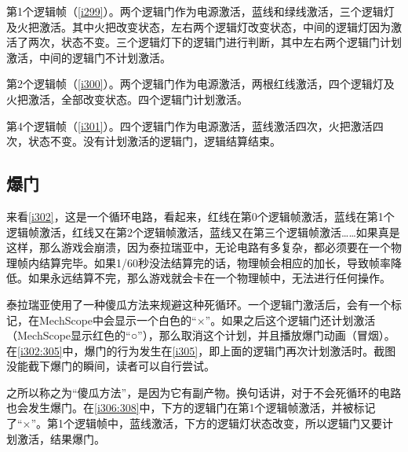 第1个逻辑帧（\autoref{i299}）。两个逻辑门作为电源激活，蓝线和绿线激活，三个逻辑灯及火把激活。其中火把改变状态，左右两个逻辑灯改变状态，中间的逻辑灯因为激活了两次，状态不变。三个逻辑灯下的逻辑门进行判断，其中左右两个逻辑门计划激活，中间的逻辑门不计划激活。

第2个逻辑帧（\autoref{i300}）。两个逻辑门作为电源激活，两根红线激活，四个逻辑灯及火把激活，全部改变状态。四个逻辑门计划激活。

第4个逻辑帧（\autoref{i301}）。四个逻辑门作为电源激活，蓝线激活四次，火把激活四次，状态不变。没有计划激活的逻辑门，逻辑结算结束。

\subsection{爆门}

来看\autoref{i302}，这是一个循环电路，看起来，红线在第0个逻辑帧激活，蓝线在第1个逻辑帧激活，红线又在第2个逻辑帧激活，蓝线又在第三个逻辑帧激活……如果真是这样，那么游戏会崩溃，因为泰拉瑞亚中，无论电路有多复杂，都必须要在一个物理帧内结算完毕。如果1/60秒没法结算完的话，物理帧会相应的加长，导致帧率降低。如果永远结算不完，那么游戏就会卡在一个物理帧中，无法进行任何操作。

泰拉瑞亚使用了一种傻瓜方法来规避这种死循环。一个逻辑门激活后，会有一个标记，在MechScope中会显示一个白色的“×”。如果之后这个逻辑门还计划激活（MechScope显示红色的“○”），那么取消这个计划，并且播放爆门动画（冒烟）。在\autoref{i302:305}中，爆门的行为发生在\autoref{i305}，即上面的逻辑门再次计划激活时。截图没能截下爆门的瞬间，读者可以自行尝试。

\begin{figure}
\begin{center}
\qquad
{}
\qquad
{}
\qquad
{}
\end{center}
\caption{}\label{i302:305}
\end{figure}

之所以称之为“傻瓜方法”，是因为它有副产物。换句话讲，对于不会死循环的电路也会发生爆门。在\autoref{i306:308}中，下方的逻辑门在第1个逻辑帧激活，并被标记了“×”。第1个逻辑帧中，蓝线激活，下方的逻辑灯状态改变，所以逻辑门又要计划激活，结果爆门。

\begin{figure}
\begin{center}
\qquad
{}
\qquad
{}
\end{center}
\caption{}\label{i306:308}
\end{figure}

